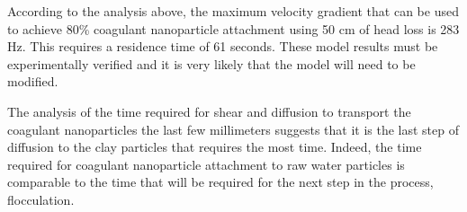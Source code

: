 \documentclass[letterpaper,10pt,english]{sphinxmanual}
\begin{document}
\begin{sphinxVerbatim}[commandchars=\\\{\}]
          
     


  

  
\end{sphinxVerbatim}

According to the analysis above, the maximum velocity gradient that can be used to achieve 80\% coagulant nanoparticle attachment using 50 cm of head loss is 283 Hz. This requires a residence time of 61 seconds. These model results must be experimentally verified and it is very likely that the model will need to be modified.

The analysis of the time required for shear and diffusion to transport the coagulant nanoparticles the last few millimeters suggests that it is the last step of diffusion to the clay particles that requires the most time. Indeed, the time required for coagulant nanoparticle attachment to raw water particles is comparable to the time that will be required for the next step in the process, flocculation.
\end{document}

